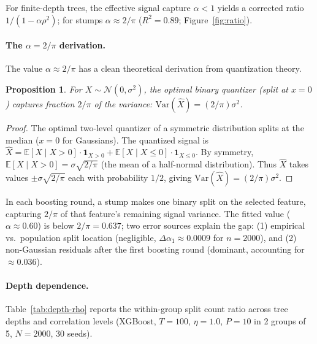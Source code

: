 \documentclass{article}
\newtheorem{proposition}[theorem]{Proposition}
\newcommand{\E}{\mathbb{E}}
\newcommand{\Var}{\mathrm{Var}}
\begin{document}
For finite-depth trees, the effective signal capture $\alpha < 1$ yields a corrected ratio $1/(1{-}\alpha\rho^2)$; for stumps $\alpha \approx 2/\pi$ ($R^2{=}0.89$; Figure~\ref{fig:ratio}).

\paragraph{The $\alpha = 2/\pi$ derivation.}
The value $\alpha \approx 2/\pi$ has a clean theoretical derivation from quantization theory.

\begin{proposition}
For $X \sim \mathcal{N}(0, \sigma^2)$, the optimal binary quantizer (split at $x = 0$) captures fraction $2/\pi$ of the variance: $\Var(\hat{X}) = (2/\pi)\sigma^2$.
\end{proposition}

\begin{proof}
The optimal two-level quantizer of a symmetric distribution splits at the median ($x = 0$ for Gaussians). The quantized signal is $\hat{X} = \E[X \mid X > 0] \cdot \mathbf{1}_{X > 0} + \E[X \mid X \leq 0] \cdot \mathbf{1}_{X \leq 0}$. By symmetry, $\E[X \mid X > 0] = \sigma\sqrt{2/\pi}$ (the mean of a half-normal distribution). Thus $\hat{X}$ takes values $\pm\sigma\sqrt{2/\pi}$ each with probability $1/2$, giving $\Var(\hat{X}) = (2/\pi)\sigma^2$.
\end{proof}

In each boosting round, a stump makes one binary split on the selected feature, capturing $2/\pi$ of that feature's remaining signal variance. The fitted value ($\alpha \approx 0.60$) is below $2/\pi = 0.637$; two error sources explain the gap: (1) empirical vs.\ population split location (negligible, $\Delta\alpha_1 \approx 0.0009$ for $n = 2000$), and (2) non-Gaussian residuals after the first boosting round (dominant, accounting for $\approx 0.036$).

\paragraph{Depth dependence.}
Table~\ref{tab:depth-rho} reports the within-group split count ratio
across tree depths and correlation levels (XGBoost, $T{=}100$, $\eta{=}1.0$,
$P{=}10$ in 2 groups of 5, $N{=}2000$, 30 seeds).
\end{document}
